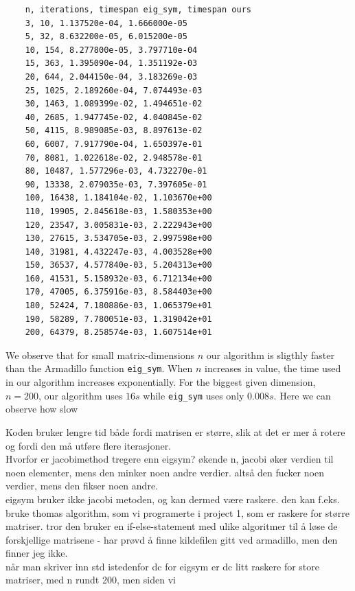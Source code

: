 \documentclass{article}
\begin{document}
  \begin{verbatim}
    n, iterations, timespan eig_sym, timespan ours
    3, 10, 1.137520e-04, 1.666000e-05
    5, 32, 8.632200e-05, 6.015200e-05
    10, 154, 8.277800e-05, 3.797710e-04
    15, 363, 1.395090e-04, 1.351192e-03
    20, 644, 2.044150e-04, 3.183269e-03
    25, 1025, 2.189260e-04, 7.074493e-03
    30, 1463, 1.089399e-02, 1.494651e-02
    40, 2685, 1.947745e-02, 4.040845e-02
    50, 4115, 8.989085e-03, 8.897613e-02
    60, 6007, 7.917790e-04, 1.650397e-01
    70, 8081, 1.022618e-02, 2.948578e-01
    80, 10487, 1.577296e-03, 4.732270e-01
    90, 13338, 2.079035e-03, 7.397605e-01
    100, 16438, 1.184104e-02, 1.103670e+00
    110, 19905, 2.845618e-03, 1.580353e+00
    120, 23547, 3.005831e-03, 2.222943e+00
    130, 27615, 3.534705e-03, 2.997598e+00
    140, 31981, 4.432247e-03, 4.003528e+00
    150, 36537, 4.577840e-03, 5.204313e+00
    160, 41531, 5.158932e-03, 6.712134e+00
    170, 47005, 6.375916e-03, 8.584403e+00
    180, 52424, 7.180886e-03, 1.065379e+01
    190, 58289, 7.780051e-03, 1.319042e+01
    200, 64379, 8.258574e-03, 1.607514e+01
  \end{verbatim}

  We observe that for small matrix-dimensions $n$ our algorithm is sligthly faster than the Armadillo function \texttt{eig\_sym}. When $n$ increases in value, the time used in our algorithm increases exponentially. For the biggest given dimension, $n = 200$, our algorithm uses $16 s$ while \texttt{eig\_sym} uses only $0.008 s$. Here we can observe how slow

  Koden bruker lengre tid både fordi matrisen er større, slik at det er mer å rotere og fordi den må
  utføre flere iterasjoner. \\

  Hvorfor er jacobimethod tregere enn eigsym? økende n, jacobi øker verdien til noen elementer, mens den minker noen andre verdier. altså den fucker noen verdier, mens den fikser noen andre. \\

  eigsym bruker ikke jacobi metoden, og kan dermed være raskere. den kan f.eks. bruke thomas algorithm, som vi programerte i project 1, som er raskere for større matriser. tror den bruker en if-else-statement med ulike algoritmer til å løse de forskjellige matrisene - har prøvd å finne kildefilen gitt ved armadillo, men den finner jeg ikke. \\

  når man skriver inn std istedenfor dc for eigsym er dc litt raskere for store matriser, med n rundt 200, men siden vi
\end{document}
